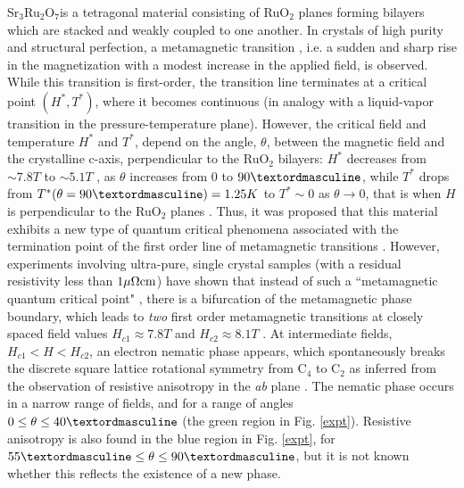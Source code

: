 \documentclass[prb,aps,amssymb,showpacs,twocolumn,amsmath,floatfix]{revtex4}
\def\SRO{Sr$_3$Ru$_2$O$_7$}
\begin{document}
\SRO  is a tetragonal material consisting of 
RuO$_2$ planes forming
 bilayers which are stacked and weakly coupled to one another. 
In crystals of high purity 
 and structural perfection, a metamagnetic transition \cite{Perry2001}, i.e. a sudden and sharp rise in the 
 magnetization with a modest increase in the applied field, is observed.  
 While this transition is first-order, 
 the transition line terminates at a critical point $(H^*,T^*)$, 
 where it becomes continuous (in analogy with a liquid-vapor 
 transition in the pressure-temperature plane).  However, 
   the critical field and temperature $H^*$ and $T^*$,
 depend on the angle, $\theta$, between the magnetic field and the crystalline c-axis, perpendicular to the  RuO$_2$ bilayers:
$H^*$ decreases from $\sim 7.8 T$ to $\sim 5.1 T$ , as $\theta$ increases from 0 to $90 \textordmasculine$, while $T^*$ drops from $T^*( \theta = 90\textordmasculine)=1.25K$ to $T^* \sim 0$ as $\theta \to 0$, that is when $H$ is perpendicular to the RuO$_2$ planes \cite{Grigera2003}. 
 Thus, it was 
 proposed that this material exhibits a new type of quantum critical phenomena 
 associated with the termination point of the first order line of metamagnetic transitions \cite{Grigera2001}.  
 However, experiments involving ultra-pure, single crystal samples (with a residual resistivity less 
 than $1 \mu \Omega{\rm cm}$) 
 have shown that instead of such a ``metamagnetic quantum critical point" \cite{Millis2002}, 
 there is a bifurcation of the metamagnetic phase boundary, which leads to {\it two} first order
 metamagnetic transitions at closely spaced field values $H_{c1} \approx 7.8T$ and $H_{c2}
 \approx 8.1T$ \cite{Perry2004}.
 At
 intermediate fields, $H_{c1} < H < H_{c2}$, an electron nematic phase
 \cite{Kivelson1998,Oganesyan2001} appears, which 
 spontaneously breaks the discrete square lattice rotational symmetry from C$_4$ to C$_2$ as
 inferred from the observation of resistive anisotropy in the
 {\it ab} plane \cite{Borzi2007}.
The nematic phase occurs in a narrow range of fields, and for a range of angles $ 0 \le \theta \le 40 \textordmasculine$ (the green region in Fig. \ref{expt}).   Resistive anisotropy is also 
found in the blue region in Fig. \ref{expt}, for $ 55 \textordmasculine \le \theta \le 90 \textordmasculine $, 
but it is not known whether this reflects the existence of a new phase.    
\end{document}
